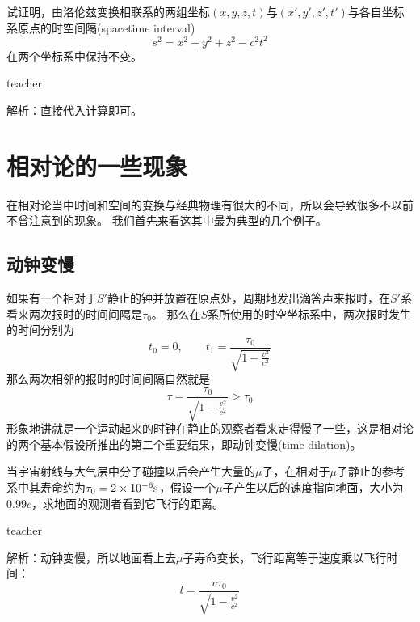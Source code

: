 \begin{example}
试证明，由洛伦兹变换相联系的两组坐标$(x,y,z,t)$与$(x',y',z',t')$与各自坐标系原点的{\heiti 时空间隔}(spacetime interval)
\[
s^2 = x^2+y^2+z^2-c^2t^2
\]
在两个坐标系中保持不变。
\begin{taggedblock}{teacher}
\noindent

解析：直接代入计算即可。
\end{taggedblock}
\end{example}



\section{相对论的一些现象}
在相对论当中时间和空间的变换与经典物理有很大的不同，所以会导致很多不以前不曾注意到的现象。
我们首先来看这其中最为典型的几个例子。

\subsection{动钟变慢}
如果有一个相对于$S'$静止的钟并放置在原点处，周期地发出滴答声来报时，在$S'$系看来两次报时的时间间隔是$\tau_0$。
那么在$S$系所使用的时空坐标系中，两次报时发生的时间分别为
\begin{equation}
t_0=0,\qquad t_1 = \frac{\tau_0}{\sqrt{1-\frac{v^2}{c^2}}}
\end{equation}
那么两次相邻的报时的时间间隔自然就是
\begin{equation}
\tau = \frac{\tau_0}{\sqrt{1-\frac{v^2}{c^2}}}>\tau_0
\end{equation}
形象地讲就是一个运动起来的时钟在静止的观察者看来走得慢了一些，这是相对论的两个基本假设所推出的第二个重要结果，即{\heiti 动钟变慢}(time dilation)。

\begin{example}
当宇宙射线与大气层中分子碰撞以后会产生大量的$\mu$子，在相对于$\mu$子静止的参考系中其寿命约为$\tau_0=2\times 10^{-6}{\rm{s}}$，假设一个$\mu$子产生以后的速度指向地面，大小为$0.99c$，求地面的观测者看到它飞行的距离。
\begin{taggedblock}{teacher}
\noindent

解析：动钟变慢，所以地面看上去$\mu$子寿命变长，飞行距离等于速度乘以飞行时间：
\[l = \frac{v\tau_0}{\sqrt{1-\frac{v^2}{c^2}}}\]
\end{taggedblock}
\end{example}


